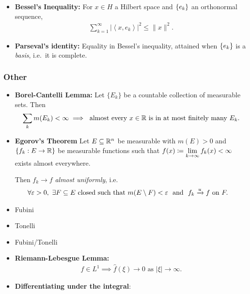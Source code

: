 \begin{itemize}
\item
  \textbf{Bessel's Inequality:} For \(x\in H\) a Hilbert space and
  \(\left\{{e_k}\right\}\) an orthonormal sequence, \begin{align*}
  \sum_{k=1}^{\infty}\left|\left\langle x, e_{k}\right\rangle\right|^{2} \leq\|x\|^{2}
  .\end{align*}
\item
  \textbf{Parseval's identity:} Equality in Bessel's inequality,
  attained when \(\left\{{e_k}\right\}\) is a \emph{basis}, i.e.~it is complete.
\end{itemize}

\hypertarget{other}{%
\subsubsection{Other}\label{other}}

\begin{itemize}
\item
  \textbf{Borel-Cantelli Lemma:} Let \(\{E_k\}\) be a countable
  collection of measurable sets. Then
  \begin{align*}
  \sum_k m(E_k) < \infty \implies \text{ almost every } x\in {\mathbb{R}} \text{ is in at most finitely many } E_k
  .\end{align*}
\item
  \textbf{Egorov's Theorem} Let \(E \subseteq {\mathbb{R}}^n\) be measurable with
  \(m(E) > 0\) and \(\left\{{f_k: E \to {\mathbb{R}}}\right\}\) be measurable functions
  such that
  \(f(x) \coloneqq \displaystyle\lim_{k\to\infty} f_k(x) < \infty\)
  exists almost everywhere.

  Then \(f_k \to f\) \emph{almost uniformly}, i.e. \begin{align*}
  \forall\varepsilon > 0, ~\exists F \subseteq E ~\text{closed such that } & 
  m(E\setminus F) < \varepsilon ~\text{ and }~ f_k \xrightarrow{u}  f ~\text{on}~ F
  .\end{align*}
\item
  Fubini
\item
  Tonelli
\item
  Fubini/Tonelli
\item
  \textbf{Riemann-Lebesgue Lemma:} \begin{align*}
  f\in L^1 \implies 
  \hat{f}(\xi) \rightarrow 0 \text { as }|\xi| \rightarrow \infty
  .\end{align*}
\item
  \textbf{Differentiating under the integral}:
\end{itemize}

